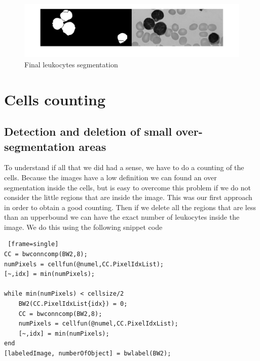 \begin{figure}
	\begin{center}
		\centering
		\includegraphics[scale=0.3]{img/segmentation.png}
		\caption{Final leukocytes segmentation }
		\label{fig:bwarea}
	\end{center}
\end{figure}

\section{Cells counting}
\subsection{Detection and deletion of small over-segmentation areas}
To understand if all that we did had a sense, we have to do a counting of the cells. Because the images have a low definition we can found an over segmentation inside the cells, but is easy to overcome this problem if we do not consider the little regions that are inside the image. This was our first approach in order to obtain a good counting. Then if we delete all the regions that are less than an upperbound we can have the exact number of leukocytes inside the image. We do this using the following snippet code
\bigskip
\begin{minipage}{\linewidth}
\begin{lstlisting} [frame=single]
CC = bwconncomp(BW2,8);
numPixels = cellfun(@numel,CC.PixelIdxList);
[~,idx] = min(numPixels);

while min(numPixels) < cellsize/2
    BW2(CC.PixelIdxList{idx}) = 0;
    CC = bwconncomp(BW2,8);
    numPixels = cellfun(@numel,CC.PixelIdxList);
    [~,idx] = min(numPixels);
end
[labeledImage, numberOfObject] = bwlabel(BW2);
\end{lstlisting}
\end{minipage}
\bigskip

